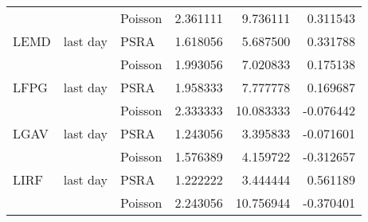 \begin{tabular}{lllrrr}
     &          & Poisson &  2.361111 &   9.736111 &  0.311543 \\
LEMD & last day & PSRA &  1.618056 &   5.687500 &  0.331788 \\
     &          & Poisson &  1.993056 &   7.020833 &  0.175138 \\
LFPG & last day & PSRA &  1.958333 &   7.777778 &  0.169687 \\
     &          & Poisson &  2.333333 &  10.083333 & -0.076442 \\
LGAV & last day & PSRA &  1.243056 &   3.395833 & -0.071601 \\
     &          & Poisson &  1.576389 &   4.159722 & -0.312657 \\
LIRF & last day & PSRA &  1.222222 &   3.444444 &  0.561189 \\
     &          & Poisson &  2.243056 &  10.756944 & -0.370401 \\
\bottomrule
\end{tabular}
